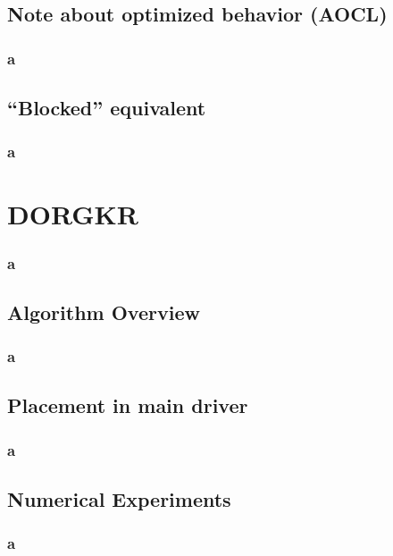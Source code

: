 \documentclass[12pt]{beamer}
\begin{document}
    \subsection{Note about optimized behavior (AOCL)}
    \begin{frame}
        \frametitle{a}
    \end{frame}
    \subsection{``Blocked'' equivalent}
    \begin{frame}
        \frametitle{a}
    \end{frame}
    \section{DORGKR}
    \begin{frame}
        \frametitle{a}
    \end{frame}
    \subsection{Algorithm Overview}
    \begin{frame}
        \frametitle{a}
    \end{frame}
    \subsection{Placement in main driver}
    \begin{frame}
        \frametitle{a}
    \end{frame}
    \subsection{Numerical Experiments}
    \begin{frame}
        \frametitle{a}
    \end{frame}
\end{document}
